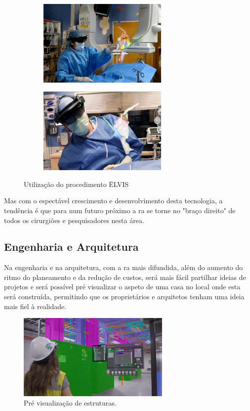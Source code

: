 \documentclass{report}
\begin{document}
\begin{figure}[H]
    \centering
    \begin{subfigure}{.5\textwidth}
      \centering
      \includegraphics[width=17em]{medicin0.jpg}
      \label{Fig:medicin0}
    \end{subfigure}%
    \begin{subfigure}{.5\textwidth}
      \centering
      \includegraphics[width=17em]{medicin1.png}
      \label{Fig:medicin1}
    \end{subfigure}
    \caption{Utilização do procedimento ĒLVIS}
    \label{Fig:medicin}
\end{figure}

Mas com o espectável crescimento e desenvolvimento desta tecnologia, a tendência é que para num futuro próximo a \ac{ra} se torne no "braço direito" de todos os cirurgiões e pesquisadores nesta área.

\subsection{Engenharia e Arquitetura}
Na engenharia e na arquitetura, com a \ac{ra} mais difundida, além do aumento do ritmo do planeamento e da redução de custos, será mais fácil partilhar ideias de projetos e será possível pré visualizar o aspeto de uma casa no local onde esta será construída, permitindo que os proprietários e arquitetos tenham uma ideia mais fiel à realidade.

\begin{figure}[H]
    \centering
    \includegraphics[width=20em]{arquieng.jpg}
    \caption{Pré visualização de estruturas.}
    \label{Fig:arquieng}
\end{figure}
\end{document}
